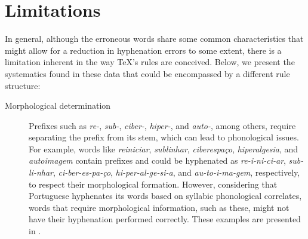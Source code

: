 \section{Limitations}

In general, although the erroneous words share some common characteristics that
might allow for a reduction in hyphenation errors to some extent, there is a
limitation inherent in the way \TeX{}'s rules are conceived. Below, we present
the systematics found in these data that could be encompassed by a different
rule structure:

\begin{description} 
    \item [Morphological determination\label{morpho-det}] Prefixes such as \emph{re-},
	\emph{sub-}, \emph{ciber-}, \emph{hiper-}, and \emph{auto-}, among others, require separating the
	prefix from its stem, which can lead to phonological issues. For example, words like
	\emph{reiniciar}, \emph{sublinhar}, \emph{ciberespaço}, \emph{hiperalgesia}, and \emph{autoimagem} contain prefixes and could be hyphenated as 
	\emph{re-i-ni-ci-ar}, \emph{sub-li-nhar}, \emph{ci-ber-es-pa-ço}, \emph{hi-per-al-ge-si-a}, and \emph{au-to-i-ma-gem}, 
	respectively, to respect their morphological formation. However,
        considering that Portuguese hyphenates its words based on syllabic phonological correlates, 
	words that require morphological information, such as these, might not have their hyphenation performed correctly. 
	These examples are presented in .



\end{description}
